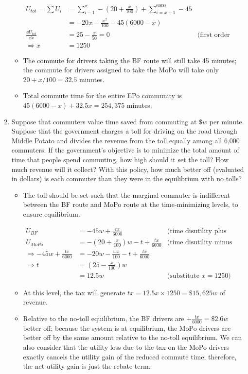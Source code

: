 \documentclass[]{article}
\providecommand{\tightlist}{%
  \setlength{\itemsep}{0pt}\setlength{\parskip}{0pt}}
\begin{document}
\begin{enumerate}
\begin{itemize}
    \begin{align*}
      U_{tot} = \sum U_i &= \sum_{i-1}^{x} -(20 + \frac{x}{100}) + \sum_{i=x+1}^{6000} -45\\
    &= -20x - \frac{x^2}{100} - 45 (6000 - x)\\
      \frac{\dd U_{tot}}{\dd x} &= 25 - \frac{x}{50} = 0 &\text{(first order cond'ns)}\\
      \Rightarrow x &= 1250
    \end{align*}
  \item
    The commute for drivers taking the BF route will still take 45
    minutes; the commute for drivers assigned to take the MoPo will take
    only \(20 + x/100 = 32.5\) minutes.
  \item
    Total commute time for the entire EPo community is
    \(45 (6000 - x) + 32.5x = 254,375\) minutes.
  \end{itemize}
\item
  Suppose that commuters value time saved from commuting at \(\$w\) per
  minute. Suppose that the government charges a toll for driving on the
  road through Middle Potato and divides the revenue from the toll
  equally among all 6,000 commuters. If the government's objective is to
  minimize the total amount of time that people spend commuting, how
  high should it set the toll? How much revenue will it collect? With
  this policy, how much better off (evaluated in dollars) is each
  commuter than they were in the equilibrium with no tolls?

  \begin{itemize}
  \tightlist
  \item
    The toll should be set such that the marginal commuter is
    indifferent between the BF route and MoPo route at the
    time-minimizing levels, to ensure equilibrium.

    \begin{align*}
      U_{BF}   &= -45w + \frac{tx}{6000} 
    &\text{(time disutility plus rebate)}\\
      U_{MoPo} &= -(20 + \frac{x}{100})w - t + \frac{tx}{6000}
    &\text{(time disutility minus tax plus rebate)}\\
      \Rightarrow -45w + \frac{tx}{6000} &= -20w - \frac{wx}{100} - t + \frac{tx}{6000}\\
      \Rightarrow t &= (25 - \frac{x}{100})w\\
    &= 12.5w &\text{(substitute $x = 1250$)}
    \end{align*}
  \item
    At this level, the tax will generate
    \(tx = 12.5x \times 1250 = \$15,625w\) of revenue.
  \item
    Relative to the no-toll equilibrium, the BF drivers are
    \(+\frac{tx}{6000} = \$2.6w\) better off; because the system is at
    equilibrium, the MoPo drivers are better off by the same amount
    relative to the no-toll equilibrium. We can also consider that the
    utility loss due to the tax on the MoPo drivers exactly cancels the
    utility gain of the reduced commute time; therefore, the net utility
    gain is just the rebate term.
  \end{itemize}
\end{enumerate}
\end{document}
